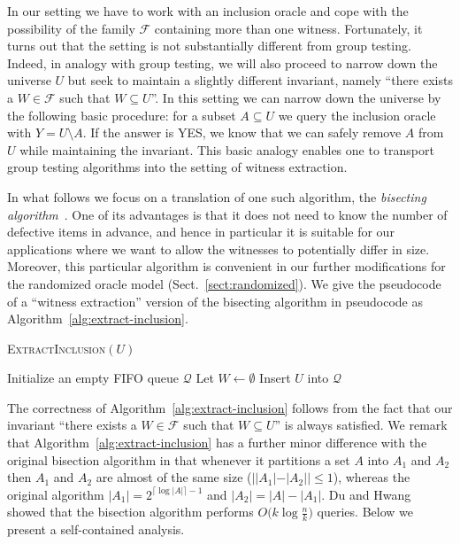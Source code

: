 \documentclass[11pt]{article}
\newcommand{\F}{\mathcal{F}}
\begin{document}
In our setting we have to work with an inclusion oracle and cope with the possibility of the family $\mathcal{F}$ containing more than one witness. Fortunately, it turns out that the setting is not substantially different from group testing. Indeed, in analogy with group testing, we will also proceed to narrow down the universe $U$ but seek to maintain a slightly different invariant, namely ``there exists a $W\in \F$ such that $W\subseteq U$''. In this setting we can narrow down the universe by the following basic procedure: for a subset $A\subseteq U$ we query the inclusion oracle with $Y=U\setminus A$. If the answer is YES, we know that we can safely remove $A$ from $U$ while maintaining the invariant. This basic analogy enables one to transport group testing algorithms into the setting of witness extraction.

In what follows we focus on a translation of one such algorithm, the {\em bisecting algorithm}~\cite{DuHwang1993}. One of its advantages is that it does not need to know the number of defective items in advance, and hence in particular it is suitable for our applications where we want to allow the witnesses to potentially differ in size. 
Moreover, this particular algorithm is convenient in our further modifications for the randomized oracle model (Sect.~\ref{sect:randomized}). 
We give the pseudocode of a ``witness extraction'' version of the bisecting algorithm in pseudocode as Algorithm~\ref{alg:extract-inclusion}. 

{
\begin{algorithm}[t]
\caption{\textsc{ExtractInclusion}$(U)$}
\label{alg:extract-inclusion}
\footnotesize
  Initialize an empty FIFO queue $\mathcal{Q}$\;
  Let $W\leftarrow\emptyset$\;
  Insert $U$ into $\mathcal{Q}$\;
\end{algorithm}
}

The correctness of Algorithm~\ref{alg:extract-inclusion} follows from the fact that our invariant ``there exists a $W\in \F$ such that $W\subseteq U$'' is always satisfied. We remark that Algorithm~\ref{alg:extract-inclusion} has a further minor difference with the original bisection algorithm in that whenever it partitions a set $A$ into $A_1$ and $A_2$ then $A_1$ and $A_2$ are almost of the same size ($||A_1|-|A_2||\leq 1$), whereas the original algorithm $|A_1|=2^{\lceil \log |A| \rceil-1}$ and $|A_2|=|A|-|A_1|$. Du and Hwang~\cite{DuHwang1993} showed that the bisection algorithm performs $O\bigl(k\log\frac{n}{k}\bigr)$ queries. Below we present a self-contained analysis.
\end{document}

